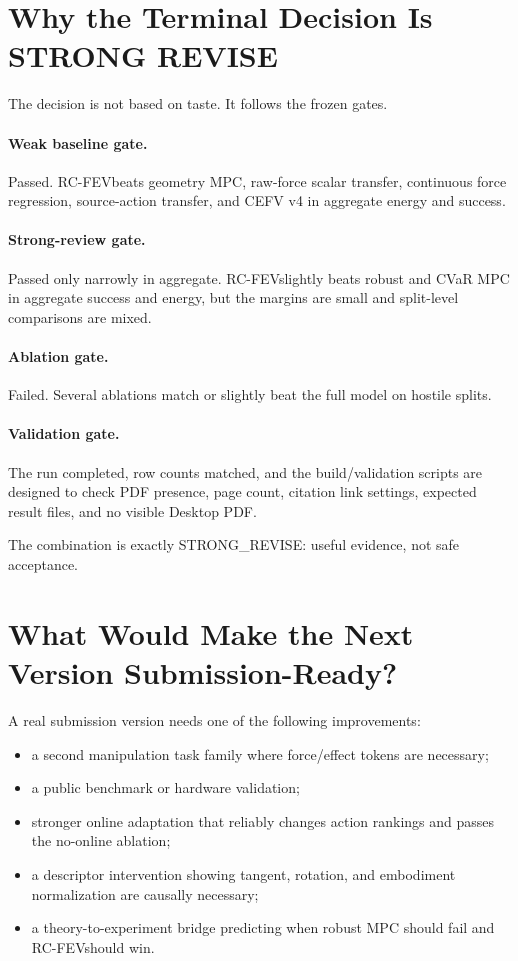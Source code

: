 \documentclass{article}
\newcommand{\method}{RC-FEV}
\begin{document}
\section{Why the Terminal Decision Is STRONG REVISE}

The decision is not based on taste. It follows the frozen gates.

\paragraph{Weak baseline gate.}
Passed. \method beats geometry MPC, raw-force scalar transfer, continuous force regression, source-action transfer, and CEFV v4 in aggregate energy and success.

\paragraph{Strong-review gate.}
Passed only narrowly in aggregate. \method slightly beats robust and CVaR MPC in aggregate success and energy, but the margins are small and split-level comparisons are mixed.

\paragraph{Ablation gate.}
Failed. Several ablations match or slightly beat the full model on hostile splits.

\paragraph{Validation gate.}
The run completed, row counts matched, and the build/validation scripts are designed to check PDF presence, page count, citation link settings, expected result files, and no visible Desktop PDF.

The combination is exactly STRONG\_REVISE: useful evidence, not safe acceptance.

\section{What Would Make the Next Version Submission-Ready?}

A real submission version needs one of the following improvements:

\begin{itemize}
\item a second manipulation task family where force/effect tokens are necessary;
\item a public benchmark or hardware validation;
\item stronger online adaptation that reliably changes action rankings and passes the no-online ablation;
\item a descriptor intervention showing tangent, rotation, and embodiment normalization are causally necessary;
\item a theory-to-experiment bridge predicting when robust MPC should fail and \method should win.
\end{itemize}
\end{document}
